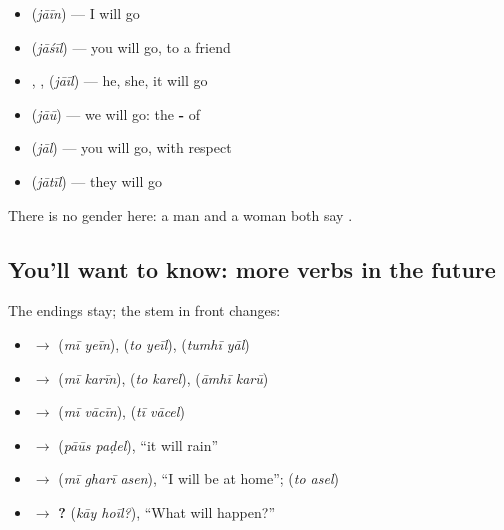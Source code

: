 \begin{itemize}
\raggedright
  \item \textbf{} \textbf{} (\emph{jāīn}) — I will go
  \item \textbf{} \textbf{} (\emph{jāśīl}) — you will go, to a friend
  \item \textbf{}, \textbf{}, \textbf{} \textbf{} (\emph{jāīl}) — he, she, it will go
  \item \textbf{} \textbf{} (\emph{jāū}) — we will go: the \textbf{-} of \textbf{}
  \item \textbf{} \textbf{} (\emph{jāl}) — you will go, with respect
  \item \textbf{} \textbf{} (\emph{jātīl}) — they will go
\end{itemize}

There is no gender here: a man and a woman both say \textbf{ }.

\subsection*{You'll want to know: more verbs in the future}
The endings stay; the stem in front changes:

\begin{itemize}
\raggedright
  \item \textbf{} $\to$ \textbf{ } (\emph{mī yeīn}), \textbf{ } (\emph{to yeīl}), \textbf{ } (\emph{tumhī yāl})
  \item \textbf{} $\to$ \textbf{ } (\emph{mī karīn}), \textbf{ } (\emph{to karel}), \textbf{ } (\emph{āmhī karū})
  \item \textbf{} $\to$ \textbf{ } (\emph{mī vācīn}), \textbf{ } (\emph{tī vācel})
  \item \textbf{} $\to$ \textbf{ } (\emph{pāūs paḍel}), \textquotedblleft{}it will rain\textquotedblright{}
  \item \textbf{} $\to$ \textbf{  } (\emph{mī gharī asen}), \textquotedblleft{}I will be at home\textquotedblright{}; \textbf{ } (\emph{to asel})
  \item \textbf{} $\to$ \textbf{ ?} (\emph{kāy hoīl?}), \textquotedblleft{}What will happen?\textquotedblright{}
\end{itemize}

